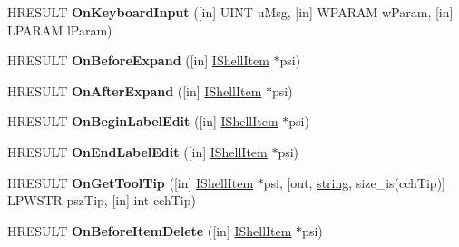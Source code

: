 \begin{DoxyCompactItemize}
H\+R\+E\+S\+U\+LT {\bfseries On\+Keyboard\+Input} (\mbox{[}in\mbox{]} U\+I\+NT u\+Msg, \mbox{[}in\mbox{]} W\+P\+A\+R\+AM w\+Param, \mbox{[}in\mbox{]} L\+P\+A\+R\+AM l\+Param)
\item 
\mbox{\label{interface_i_name_space_tree_control_events_aaa092e6b6f4efb51f7f0b00a7327f1ad}} 
H\+R\+E\+S\+U\+LT {\bfseries On\+Before\+Expand} (\mbox{[}in\mbox{]} \hyperlink{interface_i_shell_item}{I\+Shell\+Item} $\ast$psi)
\item 
\mbox{\label{interface_i_name_space_tree_control_events_abe8f20e94b795e78709352a982d62088}} 
H\+R\+E\+S\+U\+LT {\bfseries On\+After\+Expand} (\mbox{[}in\mbox{]} \hyperlink{interface_i_shell_item}{I\+Shell\+Item} $\ast$psi)
\item 
\mbox{\label{interface_i_name_space_tree_control_events_aee784b46313fa49637281119221a5194}} 
H\+R\+E\+S\+U\+LT {\bfseries On\+Begin\+Label\+Edit} (\mbox{[}in\mbox{]} \hyperlink{interface_i_shell_item}{I\+Shell\+Item} $\ast$psi)
\item 
\mbox{\label{interface_i_name_space_tree_control_events_ae61e973411aa4368086c122fb23c6ace}} 
H\+R\+E\+S\+U\+LT {\bfseries On\+End\+Label\+Edit} (\mbox{[}in\mbox{]} \hyperlink{interface_i_shell_item}{I\+Shell\+Item} $\ast$psi)
\item 
\mbox{\label{interface_i_name_space_tree_control_events_ad8da7990086dd7315743b4d3bcce48b2}} 
H\+R\+E\+S\+U\+LT {\bfseries On\+Get\+Tool\+Tip} (\mbox{[}in\mbox{]} \hyperlink{interface_i_shell_item}{I\+Shell\+Item} $\ast$psi, \mbox{[}out, \hyperlink{structstring}{string}, size\+\_\+is(cch\+Tip)\mbox{]} L\+P\+W\+S\+TR psz\+Tip, \mbox{[}in\mbox{]} int cch\+Tip)
\item 
\mbox{\label{interface_i_name_space_tree_control_events_a17850d86338d0fb15ab4c6044d478337}} 
H\+R\+E\+S\+U\+LT {\bfseries On\+Before\+Item\+Delete} (\mbox{[}in\mbox{]} \hyperlink{interface_i_shell_item}{I\+Shell\+Item} $\ast$psi)
\item 
\mbox{\label{interface_i_name_space_tree_control_events_a228c2853c998a5da7afc858c0aafd3ff}} 

\end{DoxyCompactItemize}

